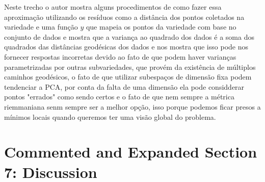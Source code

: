 \documentclass[a4paper,titlepage]{article}
\begin{document}
{{
\vspace{1em}
\centering
{}
\vspace{1em}
}

Neste trecho o autor mostra alguns procedimentos de como fazer essa aproximação utilizando os resíduos como a distância dos pontos coletados na variedade e uma função $y$ que mapeia os pontos da variedade com base no conjunto de dados e mostra que a variança ao quadrado dos dados é a soma dos quadrados das distâncias geodésicas dos dados e nos mostra que isso pode nos fornecer respostas incorretas devido ao fato de que podem haver varianças parametrizadas por outras subvariedades, que provém da existência de múltiplos caminhos geodésicos, o fato de que utilizar subespaços de dimensão fixa podem tendenciar a PCA, por conta da falta de uma dimensão ela pode considderar pontos "errados" como sendo certos e o fato de que nem sempre a métrica riemmaniana senm sempre ser a melhor opção, isso porque podemos ficar presos a mínimos locais quando queremos ter uma visão global do problema.

\section{Commented and Expanded Section 7: Discussion}

}
\end{document}

